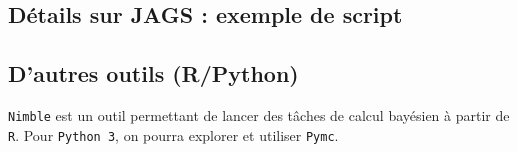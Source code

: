 \subsection{Détails sur JAGS : exemple de script}

   \begin{center} 
 \end{center}

\subsection{D'autres outils (R/Python)}

\texttt{Nimble} est un outil permettant de lancer des tâches de calcul bayésien à partir de \texttt{R}. Pour \texttt{Python 3}, on pourra explorer et utiliser \texttt{Pymc}. 